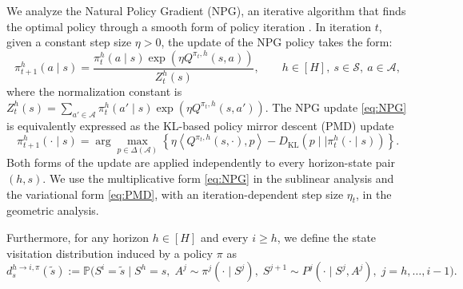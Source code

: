 \documentclass[11pt]{article}
\begin{document}
We analyze the Natural Policy Gradient (NPG), an iterative algorithm that finds the optimal policy through a smooth form of policy iteration \citep{kakade2001natural}.  In iteration $t$, given a constant step size $\eta>0$, the update of the NPG policy takes the form: 
\begin{equation}\label{eq:NPG}
\pi_{t+1}^h(a\mid s)
=
\frac{
\pi_t^h(a\mid s)
\exp\!\left(\eta Q^{\pi_t,h}(s,a)\right)
}{
Z_t^h(s)
},
\qquad
h\in[H],\ s\in\mathcal{S},\ a\in\mathcal{A},
\end{equation}
where the normalization constant is $Z_t^h(s) = {\sum_{a'\in\mathcal{A}} \pi^h_t (a' \mid s) \exp( \eta  Q^{\pi_t , h} (s,a'))}$. The NPG update \eqref{eq:NPG} is equivalently expressed as the KL-based policy
mirror descent (PMD) update
\citep{shani2020adaptive,lan2023policy}
\begin{equation}\label{eq:PMD}
\pi_{t+1}^h(\cdot\mid s)
=
\arg\max_{p\in\Delta(\mathcal{A})}
\left\{
\eta
\left\langle Q^{\pi_t,h}(s,\cdot),p\right\rangle
-
D_{\mathrm{KL}}\!\left(
p\mid\mid\pi_t^h(\cdot\mid s)
\right)
\right\}.
\end{equation}
Both forms of the update are applied independently to every horizon-state pair $(h,s)$.
We use the multiplicative form \eqref{eq:NPG} in the sublinear analysis and
the variational form \eqref{eq:PMD}, with an iteration-dependent step size
$\eta_t$, in the geometric analysis.

Furthermore, for any horizon $h \in [H]$ and every $i \geq h$, we define the state visitation distribution induced by a policy $\pi$ as
\begin{equation} \label{eq:SVD}
d^{h\to i,\pi}_s(\tilde s)
:= \mathbb{P}\Big(
S^i=\tilde s \mid
S^h=s,\;
A^j\sim \pi^j(\cdot\mid S^j),\;
S^{j+1}\sim P^j(\cdot\mid S^j,A^j),\;
j=h,\ldots,i-1
\Big).
\end{equation}
\end{document}
